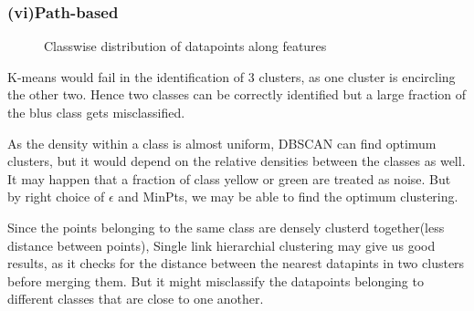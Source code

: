 \documentclass[paper=a4, fontsize=11pt]{scrartcl}
\numberwithin{equation}{section}		%
\numberwithin{figure}{section}			%
\numberwithin{table}{section}				%
\begin{document}
\subsubsection*{(vi)Path-based}
\begin{figure}[H]
  \centering
  \hfill
  \caption*{Classwise distribution of datapoints along features}
\end{figure}

K-means would fail in the identification of 3 clusters, as one cluster is encircling the other two. Hence two classes can be correctly identified but a large fraction of the blus class gets misclassified.

As the density within a class is almost uniform, DBSCAN can find optimum clusters, but it would depend on the relative densities between the classes as well. It may happen that a fraction of class yellow or green are treated as noise. But by right choice of $\epsilon$ and MinPts, we may be able to find the optimum clustering.

Since the points belonging to the same class are densely clusterd together(less distance between points), Single link hierarchial clustering may give us good results, as it checks for the distance between the nearest datapints in two clusters before merging them. But it might misclassify the datapoints belonging to different classes that are close to one another.
\end{document}
